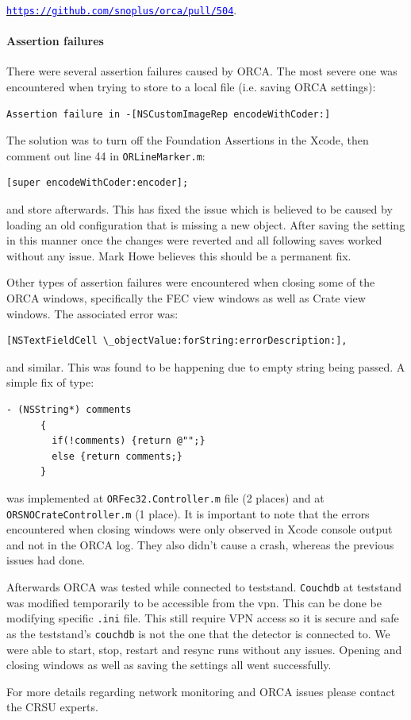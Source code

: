 \documentclass[a4paper,10pt]{article}
\newcommand{\link}[1]{\href{#1}{\textcolor{blue}{\texttt{#1}}}} %
\begin{document}
\qquad\link{https://github.com/snoplus/orca/pull/504}. 

\paragraph{Assertion failures}
There were several assertion failures caused by ORCA. The most severe one was encountered when trying to store to a local file (i.e. saving ORCA settings):
\begin{Verbatim}[xleftmargin=-8mm]
	Assertion failure in -[NSCustomImageRep encodeWithCoder:]
\end{Verbatim}

The solution was to turn off the Foundation Assertions in the Xcode, then comment out line 44 in {\tt ORLineMarker.m}:
\begin{Verbatim}[xleftmargin=-8mm]
	[super encodeWithCoder:encoder];
\end{Verbatim}
and store afterwards. This has fixed the issue which is believed to be caused by loading an old configuration that is missing a new object. After saving the setting in this manner once the changes were reverted and all following saves worked without any issue. Mark Howe believes this should be a permanent fix. 

Other types of assertion failures were encountered when closing some of the ORCA windows, specifically the FEC view windows as well as Crate view windows. The associated error was:
\begin{Verbatim}[xleftmargin=-8mm]
	[NSTextFieldCell \_objectValue:forString:errorDescription:],
\end{Verbatim}
and similar. This was found to be happening due to empty string being passed. A simple fix of type:
\begin{Verbatim}[xleftmargin=-8mm]
	- (NSString*) comments
	  {
	    if(!comments) {return @"";}
	    else {return comments;}
	  }
\end{Verbatim}
was implemented at {\tt ORFec32.Controller.m} file (2 places) and at {\tt ORSNOCrateController.m} (1 place). It is important to note that the errors encountered when closing windows were only observed in Xcode console output and not in the ORCA log. They also didn't cause a crash, whereas the previous issues had done.

Afterwards ORCA was tested while connected to teststand. {\tt Couchdb} at teststand was modified temporarily to be accessible from the vpn. This can be done be modifying specific {\tt .ini} file. This still require VPN access so it is secure and safe as the teststand's {\tt couchdb} is not the one that the detector is connected to. We were able to start, stop, restart and resync runs without any issues. Opening and closing windows as well as saving the settings all went successfully.

For more details regarding network monitoring and ORCA issues please contact the CRSU experts.


\end{document}
